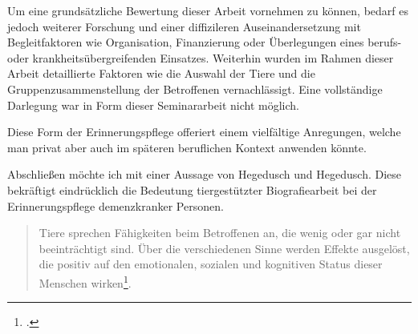 Um eine grundsätzliche Bewertung dieser Arbeit vornehmen zu können, bedarf es jedoch weiterer Forschung und einer diffizileren Auseinandersetzung mit Begleitfaktoren wie Organisation, Finanzierung oder Überlegungen eines berufs- oder krankheitsübergreifenden Einsatzes. Weiterhin wurden im Rahmen dieser Arbeit detaillierte Faktoren wie die Auswahl der Tiere und die Gruppenzusammenstellung der Betroffenen vernachlässigt. Eine vollständige Darlegung war in Form dieser Seminararbeit nicht möglich. 

Diese Form der Erinnerungspflege offeriert einem vielfältige Anregungen, welche man privat aber auch im späteren beruflichen Kontext anwenden könnte.

Abschließen möchte ich mit einer Aussage von Hegedusch und Hegedusch. Diese bekräftigt eindrücklich die Bedeutung tiergestützter Biografiearbeit bei der Erinnerungspflege demenzkranker Personen.

\begin{quotation}
Tiere sprechen Fähigkeiten beim Betroffenen an, die wenig oder gar nicht beeinträchtigt sind. Über die verschiedenen Sinne werden Effekte ausgelöst, die positiv auf den emotionalen, sozialen und kognitiven Status dieser Menschen wirken\footcite[72]{Hegedusch2007}.
\end{quotation} 
